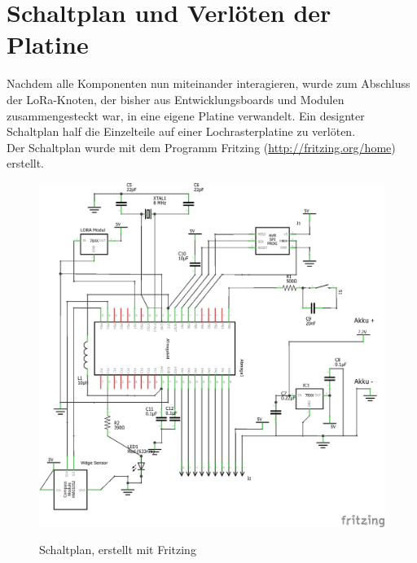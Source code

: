 \chapter{Schaltplan und Verlöten der Platine}
Nachdem alle Komponenten nun miteinander interagieren, wurde zum Abschluss der LoRa-Knoten, der bisher aus Entwicklungsboards und Modulen zusammengesteckt war, in eine eigene Platine verwandelt. Ein designter Schaltplan half die Einzelteile auf einer Lochrasterplatine zu verlöten.\\
Der Schaltplan wurde mit dem Programm Fritzing (\url{http://fritzing.org/home}) erstellt.
\begin{figure}[H]
    \center
    \includegraphics[width=15cm]{Bilder/schaltplan-1.png}\\
    \caption{Schaltplan, erstellt mit Fritzing}
    \label{fig:schaltplan}
\end{figure}
\newpage
\noindent
